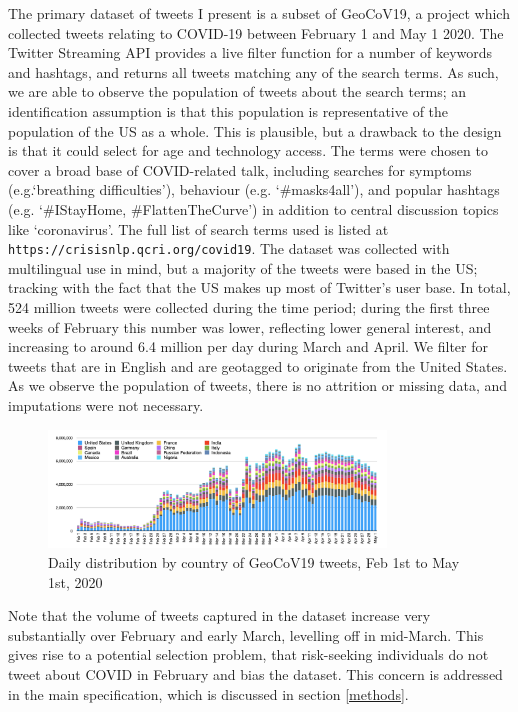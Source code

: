\documentclass{article}
\begin{document}
The primary dataset of tweets I present is a subset of GeoCoV19, a project which collected tweets relating to COVID-19 between February 1 and May 1 2020. The Twitter Streaming API provides a live filter function for a number of keywords and hashtags, and returns all tweets matching any of the search terms. As such, we are able to observe the population of tweets about the search terms; an identification assumption is that this population is representative of the population of the US as a whole. This is plausible, but a drawback to the design is that it could select for age and technology access. The terms were chosen to cover a broad base of COVID-related talk, including searches for symptoms (e.g.`breathing difficulties'), behaviour (e.g. `\#masks4all'), and popular hashtags (e.g. `\#IStayHome, \#FlattenTheCurve') in addition to central discussion topics like `coronavirus'. The full list of search terms used is listed at \texttt{https://crisisnlp.qcri.org/covid19}. The dataset was collected with multilingual use in mind, but a majority of the tweets were based in the US; tracking with the fact that the US makes up most of Twitter's user base. In total, 524 million tweets were collected during the time period; during the first three weeks of February this number was lower, reflecting lower general interest, and increasing to around 6.4 million per day during March and April. We filter for tweets that are in English and are geotagged to originate from the United States. As we observe the population of tweets, there is no attrition or missing data, and imputations were not necessary.
\begin{figure}[h!]
    \includegraphics[width=0.8\textwidth]{figs/GeoCov-countrydistribution.png}    
    \centering
    \caption{Daily distribution by country of GeoCoV19 tweets, Feb 1st to May 1st, 2020 \parencite{qaziGeoCoV19DatasetHundreds2020a}}
\end{figure}
Note that the volume of tweets captured in the dataset increase very substantially over February and early March, levelling off in mid-March. This gives rise to a potential selection problem, that risk-seeking individuals do not tweet about COVID in February and bias the dataset. This concern is addressed in the main specification, which is discussed in section \ref{methods}.
\end{document}
